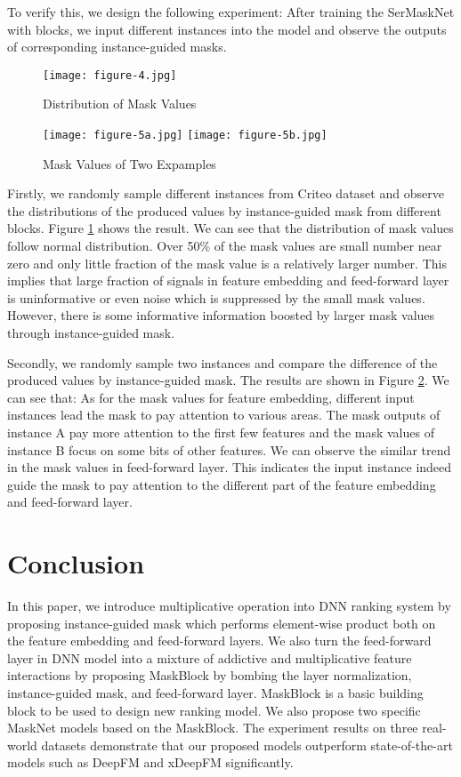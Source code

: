 \documentclass[sigconf]{acmart}
\begin{document}
To verify this, we design the following experiment: After training the SerMaskNet with  blocks, we input different  instances into the model and observe the outputs of  corresponding instance-guided masks.



\begin{figure}
  \setlength{\abovecaptionskip}{1pt}
  \texttt{[image: figure-4.jpg]}
  \caption{Distribution of Mask Values}
  \label{Fig.4}
\end{figure}

\begin{figure}
  \setlength{\abovecaptionskip}{1pt}
  \texttt{[image: figure-5a.jpg]}\hfill
  \texttt{[image: figure-5b.jpg]}
  \caption{Mask Values of Two Expamples}
  \label{Fig.5}
\end{figure}


Firstly, we randomly sample  different instances from Criteo dataset and observe the distributions of the produced values by instance-guided mask from different blocks. Figure \ref{Fig.4} shows the result. We can see that the distribution of mask values follow normal distribution. Over 50\% of the mask values are small number near zero and only little fraction of the mask value is a relatively larger number. This implies that large fraction of  signals in feature embedding and feed-forward layer is uninformative or even noise which is suppressed by the small mask values. However, there is some informative information boosted by larger mask values through instance-guided mask.


Secondly, we randomly sample two instances and compare the difference of the produced values  by instance-guided mask. The results are shown in Figure \ref{Fig.5}. We can see that: As for the mask values for feature embedding, different input instances lead the mask to pay attention to various areas. The mask outputs of instance A pay more attention to the first few features and the mask values of instance B focus on some bits of other features. We can observe the similar trend in the mask values in feed-forward layer. This indicates the input instance indeed guide the mask to pay attention to the different part of the feature embedding and feed-forward layer.



\section{Conclusion}
In this paper, we introduce multiplicative operation into DNN ranking system by proposing  instance-guided mask which performs element-wise product both on the feature embedding and feed-forward layers. We also turn the feed-forward layer in DNN model into a mixture of addictive and multiplicative feature interactions by proposing MaskBlock by bombing the layer normalization, instance-guided mask, and feed-forward layer. MaskBlock is a basic building block to be used to design new ranking model. We also propose two specific MaskNet models based on the MaskBlock. The experiment results on three real-world datasets demonstrate that our proposed models outperform state-of-the-art models such as DeepFM and xDeepFM significantly.




\end{document}
